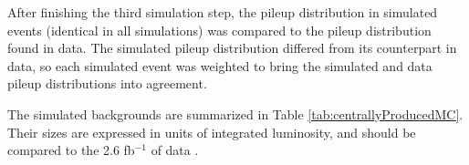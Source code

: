 After finishing the third simulation step, the pileup distribution in simulated events (identical in all simulations) was 
compared to the pileup distribution found in data.  The simulated pileup distribution differed from its counterpart in data, so 
each simulated event was weighted to bring the simulated and data pileup distributions into agreement.

The simulated backgrounds are summarized in Table \ref{tab:centrallyProducedMC}.  Their sizes are expressed in units of integrated 
luminosity, and should be compared to the 2.6 fb$^{-1}$ of data \cite{lumi}.

\begin{table}[bt]
	\caption{The ST background and \WR signal (only $\mnul = \frac{1}{2}\mWR$) simulated datasets.  The "Size" of a dataset is equal 
	to the number of simulated events divided by the 13 $\TeV$ cross section $\times$ branching fraction of the process.}
\label{tab:centrallyProducedMC}

\centering
{}
\end{table}

